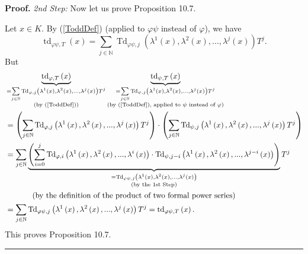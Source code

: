 \documentclass[numbers=enddot,12pt,final,onecolumn,notitlepage]{scrartcl}%
\newenvironment{proof}[1][Proof]{\noindent\textbf{#1.} }{\ \rule{0.5em}{0.5em}}
\begin{document}
\begin{proof}
\textit{2nd Step:} Now let us prove Proposition 10.7.

Let $x\in K$. By (\ref{ToddDef}) (applied to $\varphi\psi$ instead of
$\varphi$), we have%
\[
\operatorname*{td}\nolimits_{\varphi\psi,T}\left(  x\right)  =\sum
_{j\in\mathbb{N}}\operatorname*{Td}\nolimits_{\varphi\psi,j}\left(
\lambda^{1}\left(  x\right)  ,\lambda^{2}\left(  x\right)  ,...,\lambda
^{j}\left(  x\right)  \right)  T^{j}.
\]
But%
\begin{align*}
&  \underbrace{\operatorname*{td}\nolimits_{\varphi,T}\left(  x\right)
}_{\substack{=\sum\limits_{j\in\mathbb{N}}\operatorname*{Td}\nolimits_{\varphi
,j}\left(  \lambda^{1}\left(  x\right)  ,\lambda^{2}\left(  x\right)
,...,\lambda^{j}\left(  x\right)  \right)  T^{j}\\\text{(by (\ref{ToddDef}))}%
}}\underbrace{\operatorname*{td}\nolimits_{\psi,T}\left(  x\right)
}_{\substack{=\sum\limits_{j\in\mathbb{N}}\operatorname*{Td}\nolimits_{\psi
,j}\left(  \lambda^{1}\left(  x\right)  ,\lambda^{2}\left(  x\right)
,...,\lambda^{j}\left(  x\right)  \right)  T^{j}\\\text{(by (\ref{ToddDef}),
applied to }\psi\text{ instead of }\varphi\text{)}}}\\
&  =\left(  \sum\limits_{j\in\mathbb{N}}\operatorname*{Td}\nolimits_{\varphi
,j}\left(  \lambda^{1}\left(  x\right)  ,\lambda^{2}\left(  x\right)
,...,\lambda^{j}\left(  x\right)  \right)  T^{j}\right)  \cdot\left(
\sum\limits_{j\in\mathbb{N}}\operatorname*{Td}\nolimits_{\psi,j}\left(
\lambda^{1}\left(  x\right)  ,\lambda^{2}\left(  x\right)  ,...,\lambda
^{j}\left(  x\right)  \right)  T^{j}\right) \\
&  =\sum\limits_{j\in\mathbb{N}}\underbrace{\left(  \sum\limits_{i=0}%
^{j}\operatorname*{Td}\nolimits_{\varphi,i}\left(  \lambda^{1}\left(
x\right)  ,\lambda^{2}\left(  x\right)  ,...,\lambda^{i}\left(  x\right)
\right)  \cdot\operatorname*{Td}\nolimits_{\psi,j-i}\left(  \lambda^{1}\left(
x\right)  ,\lambda^{2}\left(  x\right)  ,...,\lambda^{j-i}\left(  x\right)
\right)  \right)  }_{\substack{=\operatorname*{Td}\nolimits_{\varphi\psi
,j}\left(  \lambda^{1}\left(  x\right)  ,\lambda^{2}\left(  x\right)
,...,\lambda^{j}\left(  x\right)  \right)  \\\text{(by the 1st Step)}}}T^{j}\\
&  \ \ \ \ \ \ \ \ \ \ \left(  \text{by the definition of the product of two
formal power series}\right) \\
&  =\sum_{j\in\mathbb{N}}\operatorname*{Td}\nolimits_{\varphi\psi,j}\left(
\lambda^{1}\left(  x\right)  ,\lambda^{2}\left(  x\right)  ,...,\lambda
^{j}\left(  x\right)  \right)  T^{j}=\operatorname*{td}\nolimits_{\varphi
\psi,T}\left(  x\right)  .
\end{align*}
This proves Proposition 10.7.
\end{proof}
\end{document}

